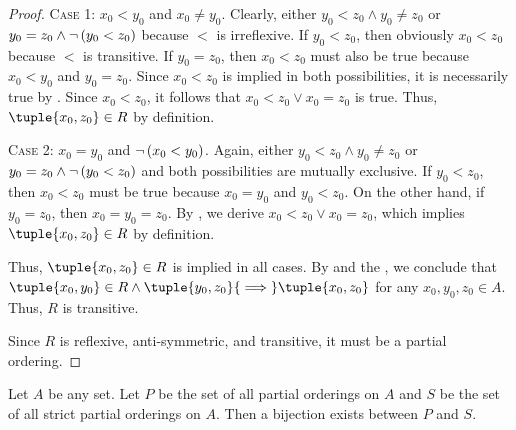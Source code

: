 \begin{proof}
    \vspace{0.3cm}
    \noindent
    {\scshape Case 1}: \( x_{0} < y_{0} \) and \( x_{0} \neq y_{0} \). Clearly, either \( y_{0} < z_{0} \land y_{0} \neq z_{0} \) or
    \( y_{0} = z_{0} \land \lnot \, \mleft( y_{0} < z_{0} \mright) \) because \( < \) is irreflexive. If \( y_{0} < z_{0} \), then
    obviously \( x_{0} < z_{0} \) because \( < \) is transitive. If \( y_{0} = z_{0} \), then \( x_{0} < z_{0} \) must also be true
    because \( x_{0} < y_{0} \) and \( y_{0} = z_{0} \). Since \( x_{0} < z_{0} \) is implied in both possibilities, it is necessarily
    true by . Since \( x_{0} < z_{0} \), it follows that \( x_{0} < z_{0} \lor x_{0} = z_{0} \) is true. Thus,
    \( \tuple{x_{0},z_{0}} \in R \) by definition.

    \vspace{0.3cm}
    \noindent
    {\scshape Case 2}: \( x_{0} = y_{0} \) and \( \lnot \, \mleft( x_{0} < y_{0} \mright) \). Again, either \( y_{0} < z_{0} \land y_{0} \neq z_{0} \)
    or \( y_{0} = z_{0} \land \lnot \, \mleft( y_{0} < z_{0} \mright) \) and both possibilities are mutually exclusive. If \( y_{0} < z_{0} \), then
    \( x_{0} < z_{0} \) must be true because \( x_{0} = y_{0} \) and \( y_{0} < z_{0} \). On the other hand, if \( y_{0} = z_{0} \), then \( x_{0} = y_{0} = z_{0} \).
    By , we derive \( x_{0} < z_{0} \lor x_{0} = z_{0} \), which implies \( \tuple{x_{0},z_{0}} \in R \) by definition.

    \vspace{0.3cm}
    \noindent
    Thus, \( \tuple{x_{0},z_{0}} \in R \) is implied in all cases. By  and the , we conclude that
    \( \tuple{x_{0},y_{0}} \in R \land \tuple{y_{0},z_{0}} {\implies} \tuple{x_{0},z_{0}} \) for any \( x_{0},y_{0},z_{0} \in A \). Thus,
    \( R \) is transitive.

    \vspace{0.3cm}
    \noindent
    Since \( R \) is reflexive, anti-symmetric, and transitive, it must be a partial ordering.
\end{proof}

\begin{thm}
    \label{thm:a-bijection-exists-between-all-partial-orderings-and-strict-partial-orderings}
    Let \( A \) be any set. Let \( P \) be the set of all partial orderings on \( A \) and \( S \)
    be the set of all strict partial orderings on \( A \). Then a bijection exists between \( P \)
    and \( S \).
\end{thm}

